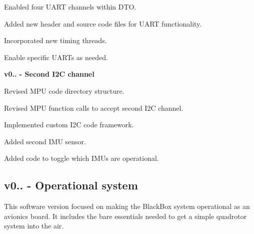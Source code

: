 \begin{DoxyItemize}
\begin{DoxyItemize}
\item Enabled four U\+A\+RT channels within D\+TO.  
\item Added new header and source code files for U\+A\+RT functionality.  
\item Incorporated new timing threads.  
\item Enable specific U\+A\+R\+Ts as needed.  
\end{DoxyItemize}
\item {\bfseries  v0.. -\/ Second I2C channel } 
\begin{DoxyItemize}
\item Revised M\+PU code directory structure.  
\item Revised M\+PU function calls to accept second I2C channel.  
\item Implemented custom I2C code framework.  
\item Added second I\+MU sensor.  
\item Added code to toggle which I\+M\+Us are operational.  
\end{DoxyItemize}
\end{DoxyItemize}

\subsection*{v0.. -\/ Operational system }

This software version focused on making the Black\+Box system operational as an avionics board. It includes the bare essentials needed to get a simple quadrotor system into the air.


